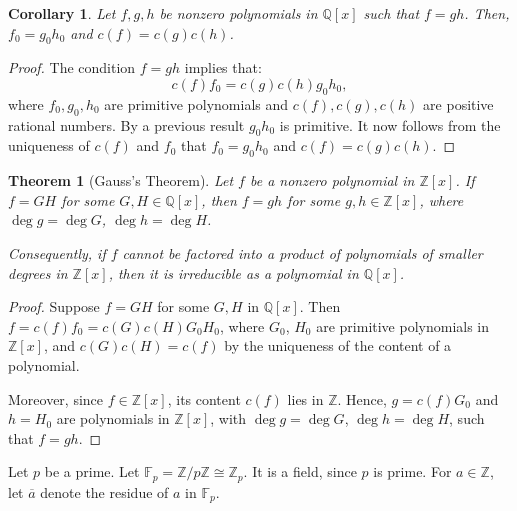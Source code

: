 \documentclass[a4paper,12pt]{report}
\newcommand{\ol}[1]{\overline{#1}}
\newcounter{statement}
\numberwithin{statement}{chapter}
\newtheorem{thm}[statement]{Theorem}
\newtheorem{cor}[statement]{Corollary}
\numberwithin{equation}{chapter}
\numberwithin{section}{chapter}
\numberwithin{subsection}{section}
\begin{document}
\begin{cor}
Let $f, g, h$ be nonzero polynomials in $\mathbb{Q}[x]$ such that $f = gh$.
Then, $f_0 = g_0h_0$ and $c(f) = c(g)c(h)$.
\end{cor}
\begin{proof}

The condition $f = gh$ implies that:
\[
c(f)f_0 = {c(g)}{c(h)} g_0h_0,
\]
where $f_0, g_0, h_0$ are primitive polynomials and $c(f), c(g), c(h)$ are positive rational numbers.
By a previous result $g_0h_0$ is primitive.  It now follows from the uniqueness of $c(f)$ and $f_0$
that $f_0 = g_0h_0$ and $c(f) = c(g)c(h)$.


\end{proof}







\begin{thm}[Gauss's Theorem]


Let $f$ be a nonzero polynomial in $\mathbb{Z}[x]$.
If $f = GH$ for some $G, H \in \mathbb{Q}[x]$, then
$f = gh$ for some $g, h \in \mathbb{Z}[x]$, where
$\deg g = \deg G$, $\deg h = \deg H$.



Consequently, if $f$ cannot be factored into a product of polynomials of smaller degrees in $\mathbb{Z}[x]$,
then it is irreducible as a polynomial in $\mathbb{Q}[x]$.
\end{thm}
\begin{proof}

Suppose $f = GH$ for some $G, H$ in $\mathbb{Q}[x]$.
Then $f = c(f) f_0 = c(G)c(H) G_0 H_0$,
where $G_0$, $H_0$ are primitive polynomials in $\mathbb{Z}[x]$,
and $c(G)c(H) = c(f)$ by the uniqueness of the content of a polynomial.




Moreover, since $f \in \mathbb{Z}[x]$, its content $c(f)$ lies in $\mathbb{Z}$.
Hence, $g = c(f) G_0$ and $h = H_0$ are polynomials in $\mathbb{Z}[x]$,
with $\deg g = \deg G$, $\deg h = \deg H$, such that $f = gh$.


\end{proof}







Let $p$ be a prime.
Let $\mathbb{F}_p = \mathbb{Z}/p\mathbb{Z} \cong \mathbb{Z}_p$.  It is a field, since $p$ is prime.
For $a \in \mathbb{Z}$, let $\ol{a}$ denote the residue of $a$ in $\mathbb{F}_p$.
\end{document}
